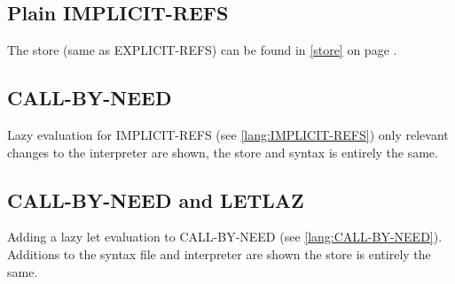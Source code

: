 \documentclass[../codeprint.tex]{subfiles}
\begin{document}
\subsection{Plain IMPLICIT-REFS}
\label{lang:IMPLICIT-REFS}
The store (same as EXPLICIT-REFS) can be found in \autoref{store} on page \pageref{store}.



\subsection{CALL-BY-NEED}
\label{lang:CALL-BY-NEED}
Lazy evaluation for IMPLICIT-REFS (see \autoref{lang:IMPLICIT-REFS}) only relevant changes to the interpreter are shown, the store and syntax is entirely the same.


\subsection{CALL-BY-NEED and LETLAZ}
\label{lang:CALL-BY-NEED-LETLAZ}
Adding a lazy let evaluation to CALL-BY-NEED (see \autoref{lang:CALL-BY-NEED}). Additions to the syntax file and interpreter are shown the store is entirely the same.


\end{document}
